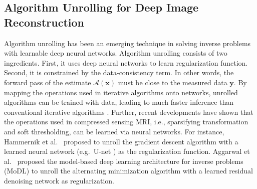 \documentclass[journal,twoside,web]{ieeecolor}
\begin{document}
%


	\subsection{Algorithm Unrolling for Deep Image Reconstruction}

	Algorithm unrolling has been an emerging technique
	in solving inverse problems with learnable deep neural networks.
	Algorithm unrolling consists of two ingredients.
	First, it uses deep neural networks to learn regularization function.
	Second, it is constrained
	by the data-consistency term.
	In other words,
	the forward pass of the estimate $\mathcal{A} (\mathbf{x})$
	must be close to the measured data $\mathbf{y}$.
	By mapping the operations used in iterative algorithms
	onto networks, unrolled algorithms can be trained with data,
	leading to much faster inference
	than conventional iterative algorithms \cite{monga_2021_algunroll}.
	Further, recent developments have shown that
	the operations used in compressed sensing MRI,
	i.e., sparsifying transformation and soft thresholding,
	can be learned via neural networks.
	For instance, Hammernik et al.~\cite{hammernik_2018_varnet}
	proposed to unroll the gradient descent algorithm
	with a learned neural network
	(e.g.~U-net \cite{ronneberger_2015_unet})
	as the regularization function.
	Aggarwal et al.~\cite{aggarwal_2018_modl} proposed
	the model-based deep learning architecture for inverse problems (MoDL)
	to unroll the alternating minimization algorithm
	with a learned residual denoising network \cite{he_2016_resnet}
	as regularization.
\end{document}
